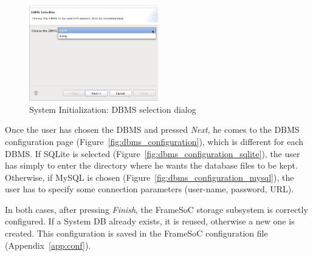 \documentclass[twoside]{article}
\begin{document}
\begin{sloppypar}
\begin{figure}[h!]
  \centering
    \includegraphics[width=0.5\textwidth]{images/dbms_selection.png}
  \caption{System Initialization: DBMS selection dialog}
  \label{fig:dbms_selection}
\end{figure}

Once the user has chosen the DBMS and pressed \emph{Next}, he comes to the DBMS configuration page (Figure~\ref{fig:dbms_configuration}), which is different for each DBMS.
If SQLite is selected (Figure~\ref{fig:dbms_configuration_sqlite}), the user has simply to enter the directory where he wants the database files to be kept.
Otherwise, if MySQL is chosen (Figure~\ref{fig:dbms_configuration_mysql}), the user has to specify some connection parameters (user-name, password, URL).

In both cases, after pressing \emph{Finish}, the FrameSoC storage subsystem is correctly configured. 
If a System DB already exists, it is reused, otherwise a new one is created.
This configuration is saved in the FrameSoC configuration file (Appendix~\ref{app:conf}). %


\end{sloppypar}
\end{document}
